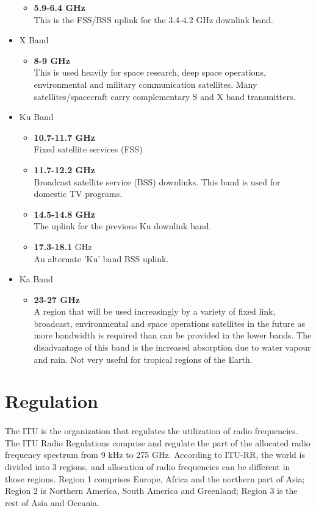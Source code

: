 \documentclass[12pt,a4paper]{report}
\begin{document}
\begin{itemize}
\begin{itemize}
	\item \textbf{5.9-6.4 GHz}\\
	This is the FSS/BSS uplink for the 3.4-4.2 GHz downlink band.
	\end{itemize}
\item X Band
	\begin{itemize}
	\item \textbf{8-9 GHz}\\
	This is used heavily for space research, deep space operations, environmental and military communication satellites. Many satellites/spacecraft carry complementary S and X band transmitters.
	\end{itemize}
\item Ku Band
	\begin{itemize}
	\item \textbf{10.7-11.7 GHz}\\
	Fixed satellite services (FSS)
	\item \textbf{11.7-12.2 GHz}\\
	Broadcast satellite service (BSS) downlinks. This band is used for domestic TV programs.
	\item \textbf{14.5-14.8 GHz}\\
	The uplink for the previous Ku downlink band.
	\item \textbf{17.3-18.1} GHz\\
	An alternate 'Ku' band BSS uplink.
	\end{itemize}
\item Ka Band
	\begin{itemize}
	\item \textbf{23-27 GHz}\\
	A region that will be used increasingly by a variety of fixed link, broadcast, environmental and space operations satellites in the future as more bandwidth is required than can be provided in the lower bands. The disadvantage of this band is the increased absorption due to water vapour and rain. Not very useful for tropical regions of the Earth.
	\end{itemize}
\end{itemize}

\section{Regulation}
\paragraph{}The ITU is the organization that regulates the utilization of radio frequencies.  The ITU Radio Regulations comprise and regulate the part of the allocated radio frequency spectrum from 9 kHz to 275 GHz. According to ITU-RR, the world is divided into 3 regions, and allocation of radio frequencies can be different in those regions. Region 1 comprises Europe, Africa and the northern part of Asia; Region 2 is Northern America, South America and Greenland; Region 3 is the rest of Asia and Oceania.
\end{document}
